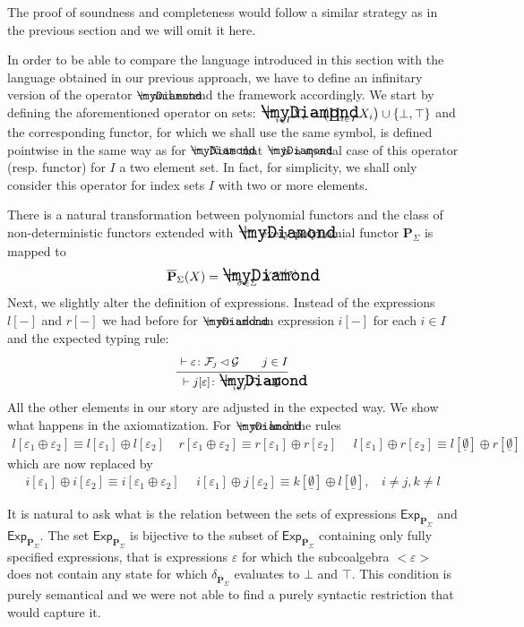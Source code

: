 \documentclass{LMCS}
\newcommand\E\varepsilon
\newcommand\Exp{\mathsf{Exp}}
\newcommand\G{\mathcal{G}}
\newcommand\F{\mathcal{F}}
\newcommand\Pol{\mathbf{P}}
\newcommand\emp{\underline\emptyset}
\newcommand{\rules}[2]{\mbox{$\frac {\mbox{\small \rule[-5pt]{0pt}{14pt} $#1$}}
                      {\mbox{\small \rule[0pt]{0pt}{10pt}$#2$}}$}}
\newcommand{\myplus}{\mathbin{\rlap{$\myDiamond$}\hspace*{.01cm}\raisebox{.14ex}{$+$}}}
\newcommand{\mybigplus}{\scalebox{1.5}{$\myplus$}}
\theoremstyle{definition}
\theoremstyle{plain}
\theoremstyle{plain}
\theoremstyle{plain}
\theoremstyle{plain}
\theoremstyle{definition}
\theoremstyle{definition}
\begin{document}
The proof of soundness and completeness would follow a similar strategy as in the previous section and we will omit it here.

In order to be able to compare the language introduced in this section
with the language obtained in our previous approach, we have to define
an infinitary version of the operator $\myplus$ and extend the
framework accordingly. We start by defining the aforementioned operator on sets:
$\mybigplus_{i\in I} X_i = \left(\coprod_{i\in I} X_i\right) \cup \{\bot,\top\} $
and the corresponding functor, for which we shall use the same symbol, is defined pointwise in the same way as for $\myplus$.
Note that $\myplus$ is a special case of this operator (resp. functor)
for $I$ a two element set. In fact, for simplicity, we shall only
consider this operator for index sets $I$ with  two or more elements. 

There is a natural transformation between polynomial functors and
the class of non-deterministic functors extended with $\mybigplus$:
every polynomial functor $\Pol_\Sigma$ is mapped to
$$\overline{\Pol}_\Sigma(X) = \mybigplus_{\sigma\in \Sigma} \
X^{\mathit{ar}(\sigma)}$$ 
Next, we slightly alter the definition of expressions. Instead of the
expressions $l[-]$ and $r[-]$ we had before for $\myplus$ we add
an expression $i[-]$ for each $i\in I$ and the expected typing rule:
\[
\rules{\vdash \E\colon \F_j\lhd \G\ \ \ \ \ \ j\in I}
      {\vdash j[\E] \colon  \mybigplus_{i\in I} \F_i\lhd \G}
\]
All the other elements in our story are adjusted in the expected
way. We show what happens in the axiomatization.
For $\myplus$ we had the rules 
\[
\begin{array}{l}
 l[\E_1 \oplus \E_2] \equiv l[\E_1] \oplus l[\E_2] \ \ \ \ \ 
   r[\E_1 \oplus \E_2] \equiv r[\E_1] \oplus
r[\E_2]\ \ \ \ \ \ 
 l[\E_1] \oplus r[\E_2] \equiv l[\emp] \oplus r[\emp]
 \end{array}
\]
which are now replaced by
\[
\begin{array}{l}
i[\E_1]\oplus i[\E_2] \equiv i[\E_1\oplus \E_2]\ \ \ \ \ \ 
i[\E_1]\oplus j[\E_2] \equiv k[\emp]\oplus l[\emp], \ \ \ \
i\neq j, k\neq l
\end{array}
\]

It is natural to ask what is the relation between the sets of
expressions $\Exp_{\Pol_\Sigma}$ and $\Exp_{\overline{\Pol}_\Sigma}$.
The set  $\Exp_{\Pol_\Sigma}$ is bijective to the subset of
$\Exp_{\overline{\Pol}_\Sigma}$ containing only fully specified
expressions, that is expressions $\E$ for which the subcoalgebra
$<\E>$ does not contain any state for which
$\delta_{\overline{\Pol}_\Sigma}$ evaluates to $\bot$ and $\top$.
This condition is purely semantical and we were not able to find a purely syntactic restriction that would capture it.
\end{document}
